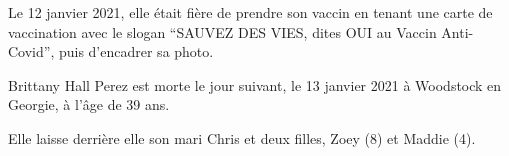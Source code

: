 Le 12 janvier 2021, elle était fière de prendre son vaccin en tenant une carte
de vaccination avec le slogan “SAUVEZ DES VIES, dites OUI au Vaccin Anti-Covid”,
puis d'encadrer sa photo.

Brittany Hall Perez est morte le jour suivant, le 13 janvier 2021 à Woodstock en
Georgie, à l'âge de 39 ans.

Elle laisse derrière elle son mari Chris et deux filles, Zoey (8) et Maddie (4).

